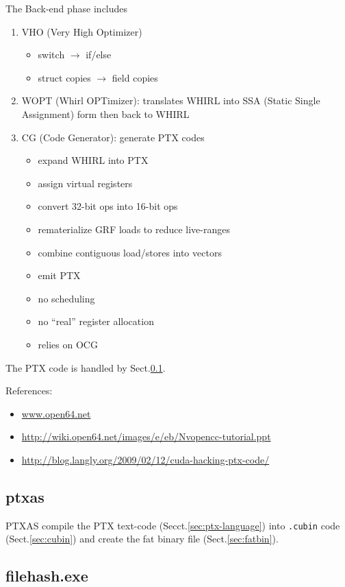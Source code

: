 The Back-end phase includes
\begin{enumerate}
\item VHO (Very High Optimizer)
  \begin{itemize}
  \item switch $\rightarrow$ if/else
  \item struct copies $\rightarrow$ field copies
  \end{itemize}
\item WOPT (Whirl OPTimizer): translates WHIRL into SSA (Static Single
  Assignment) form then back to WHIRL
\item CG (Code Generator): generate PTX codes
  \begin{itemize}
  \item expand WHIRL into PTX
  \item assign virtual registers
  \item convert 32-bit ops into 16-bit ops
  \item rematerialize GRF loads to reduce live-ranges
  \item combine contiguous load/stores into vectors
  \item emit PTX
  \item no scheduling
  \item no ``real'' register allocation
  \item relies on OCG
  \end{itemize}
\end{enumerate}
The PTX code is handled by Sect.\ref{sec:ptxas}.

References:
\begin{itemize}
\item \url{www.open64.net}
\item \url{http://wiki.open64.net/images/e/eb/Nvopencc-tutorial.ppt}
\item \url{http://blog.langly.org/2009/02/12/cuda-hacking-ptx-code/}
\end{itemize}

\subsection{ptxas}
\label{sec:ptxas}

PTXAS compile the PTX text-code (Secct.\ref{sec:ptx-language}) into
\verb!.cubin! code (Sect.\ref{sec:cubin}) and create the fat binary file
(Sect.\ref{sec:fatbin}).

\subsection{filehash.exe}

